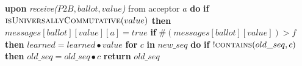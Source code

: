 \documentclass[algorithms,article,accept,moreauthors,pdftex,10pt,a4paper]{Definitions/mdpi}
\begin{document}
\begin{algorithm}[H]
\begin{algorithmic}[1]
\State
\State \textbf{upon} \textit{receive($P2B, ballot, value$)} from acceptor $a$ \textbf{do}
\State \hspace{\algorithmicindent} \textbf{if} $\Call{isUniversallyCommutative}{value}$ \textbf{then}
\State \hspace{\algorithmicindent}\hspace{\algorithmicindent}
$messages[ballot][value][a] = true$
\State \hspace{\algorithmicindent}\hspace{\algorithmicindent} \textbf{if} $\#(messages[ballot][value]) > f$ \textbf{then} 
\State \hspace{\algorithmicindent}\hspace{\algorithmicindent}\hspace{\algorithmicindent} $learned = learned \bullet value$
\State 
{}
\State \textbf{for} $c$ \textbf{in} $new\_seq$ \textbf{do} 
\State \hspace{\algorithmicindent} \textbf{if} $!\Call{contains}{old\_seq,c}$ \textbf{then}
\State \hspace{\algorithmicindent}\hspace{\algorithmicindent}\hspace{\algorithmicindent} $old\_seq = old\_seq \bullet c$
\State \textbf{return} $old\_seq$
\EndFunction
\end{algorithmic}
\end{algorithm}
\end{document}
